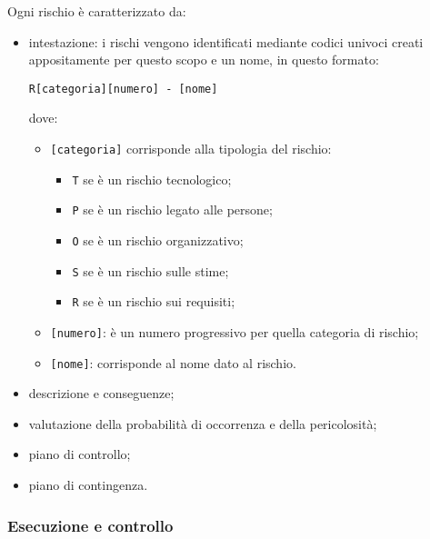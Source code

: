         \vspace{0.3cm}
        \noindent
        Ogni rischio è caratterizzato da:
        \begin{itemize}
            \item intestazione: i rischi vengono identificati mediante codici univoci creati appositamente per questo scopo e un nome, in questo formato:

            \begin{center}
                \verb|R[categoria][numero] - [nome]|
            \end{center}
            
            dove:
            \begin{itemize}
                \item \verb|[categoria]| corrisponde alla tipologia del rischio:
                \begin{itemize}
                    \item \verb|T| se è un rischio tecnologico;
                    \item \verb|P| se è un rischio legato alle persone;
                    \item \verb|O| se è un rischio organizzativo;
                    \item \verb|S| se è un rischio sulle stime;
                    \item \verb|R| se è un rischio sui requisiti;
                \end{itemize}
                \item \verb|[numero]|: è un numero progressivo per quella categoria di rischio;
                \item \verb|[nome]|: corrisponde al nome dato al rischio.
            \end{itemize}
            \item descrizione e conseguenze;
            \item valutazione della probabilità di occorrenza e della pericolosità;
            \item piano di controllo;
            \item piano di contingenza.
        \end{itemize}

        
    \subsubsection{Esecuzione e controllo}\label{sec:execution}

